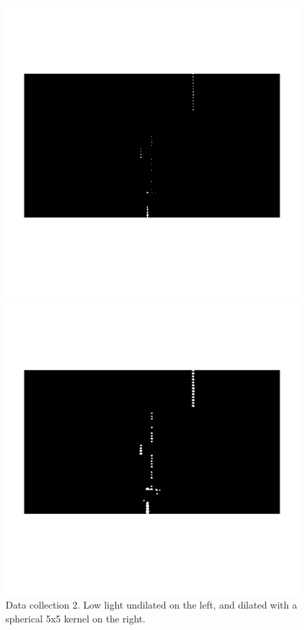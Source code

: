 \begin{figure}[H]	
	\begin{minipage}[t]{0.48\textwidth}
		\centering	
		\includegraphics[width=1.0\textwidth]{figures/ImageAnalysis/dilation/lowlight2_no_dilation.png}
	\end{minipage}
	\hspace{0.01\textwidth}
	\begin{minipage}[t]{0.48\textwidth}
		\centering	
		\includegraphics[width=1.0\textwidth]{figures/ImageAnalysis/dilation/lowlight2_dilation.png}
	\end{minipage}
	\setlength{\abovecaptionskip}{-40pt}
	\caption{Data collection 2. Low light undilated on the left, and dilated with a spherical 5x5 kernel on the right.}
	\label{fig:dilate_lowlight2}
\end{figure}

